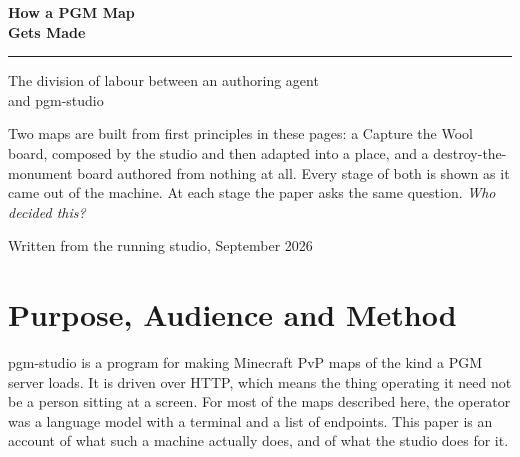 \thispagestyle{empty}

\begin{center}
\vspace*{2.2cm}

{\sffamily\fontsize{34}{38}\selectfont\bfseries\color{ink} How a PGM Map\\[2pt] Gets Made}

\vspace{14pt}
{\color{rule}\rule{0.32\textwidth}{1.1pt}}
\vspace{14pt}

{\sffamily\large\color{ink60} The division of labour between an authoring agent\\ and \textsf{pgm-studio}}

\vspace{2.4cm}

\begin{minipage}{0.76\textwidth}
\small\color{ink}
Two maps are built from first principles in these pages: a Capture the Wool
board, composed by the studio and then adapted into a place, and a
destroy-the-monument board authored from nothing at all. Every stage of both is
shown as it came out of the machine. At each stage the paper asks the same
question. \emph{Who decided this?}
\end{minipage}

\vfill

{\footnotesize\sffamily\color{ink60}
Written from the running studio, September 2026\par}

\vspace{1.2cm}
\end{center}

\clearpage

\thispagestyle{empty}
\vspace*{1cm}

\section*{Purpose, Audience and Method}

\noindent
\textsf{pgm-studio} is a program for making Minecraft PvP maps of the kind a PGM
server loads. It is driven over HTTP, which means the thing operating it need not
be a person sitting at a screen. For most of the maps described here, the operator
was a language model with a terminal and a list of endpoints. This paper is an
account of what such a machine actually does, and of what the studio does for it.

